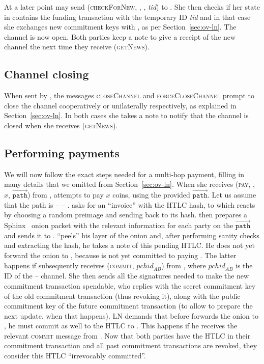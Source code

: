     At a later point \environment{} may send (\textsc{checkForNew}, \alice,
    \bob, \textit{tid}) to \alice. She then checks if her state in \ledger{}
    contains the funding transaction with the temporary ID \textit{tid} and in
    that case she exchanges new commitment keys with \bob, as
    per Section~\ref{sec:ov-ln}. The channel is now open. Both parties keep a
    note to give \environment{} a receipt of the new channel the next time they
    receive (\textsc{getNews}).

  \subsection{Channel closing}
    When sent by \environment, the messages \textsc{closeChannel} and
    \textsc{forceCloseChannel} prompt \alice{} to close the channel
    cooperatively or unilaterally respectively, as explained in
    Section~\ref{sec:ov-ln}. In both cases she takes a note to notify
    \environment{} that the channel is closed when she receives
    (\textsc{getNews}).

  \subsection{Performing payments}
    We will now follow the exact steps needed for a multi-hop payment,
    filling in many details that we omitted from Section~\ref{sec:ov-ln}. When
    she receives (\textsc{pay}, \charlie, $x$, $\overrightarrow{\mathtt{path}}$)
    from \environment, \alice{} attempts to pay \charlie{} $x$ coins, using the
    provided $\overrightarrow{\mathtt{path}}$. Let us assume that the path is
    \alice{} -- \bob{} -- \charlie. \alice{} asks \charlie{} for an
    ``invoice'' with the HTLC hash, to which \charlie{} reacts
    by choosing a random preimage and sending back to \alice{} its hash.
    \alice{} then prepares a Sphinx~\cite{sphinx} onion packet with the relevant
    information for each party on the $\overrightarrow{\mathtt{path}}$ and sends
    it to \bob{}. \bob{} ``peels'' his layer of the onion and, after performing
    sanity checks and extracting the hash, he takes a note of this
    pending HTLC. He does not yet forward the onion to \charlie, because
    \alice{} is not yet committed to paying \bob. The latter happens if \alice{}
    subsequently receives (\textsc{commit}, $\mathit{pchid}_{AB}$) from
    \environment, where $\mathit{pchid}_{AB}$ is the ID of the \alice{}
    -- \bob{} channel. She then sends \bob{} all the signatures needed to make
    the new commitment transaction spendable, who replies with the secret
    commitment key of the old commitment transaction (thus revoking it), along
    with the public commitment key of the future commitment transaction (to
    allow \alice{} to prepare the next update, when that happens). LN demands
    that before \bob{} forwards the onion to \charlie, he must
    commit as well to the HTLC to \alice. This happens if he receives
    the relevant \textsc{commit} message from \environment. Now that both
    parties have the HTLC in their commitment transaction and all past
    commitment transactions are revoked, they consider this HTLC ``irrevocably
    committed''.

